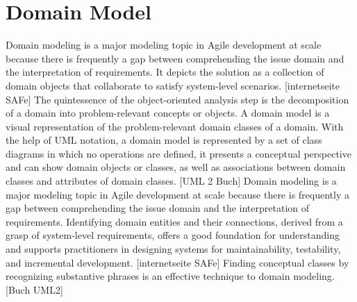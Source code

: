 \section{Domain Model}
Domain modeling is a major modeling topic in Agile development at scale because there is frequently a gap between comprehending the issue domain and the interpretation of requirements. It depicts the solution as a collection of domain objects that collaborate to satisfy system-level scenarios. [internetseite SAFe] The quintessence of the object-oriented analysis step is the decomposition of a domain into problem-relevant concepts or objects. A domain model is a visual representation of the problem-relevant domain classes of a domain. With the help of UML notation, a domain model is represented by a set of class diagrams in which no operations are defined, it presents a conceptual perspective and can show domain objects or classes, as well as associations between domain classes and attributes of domain classes. [UML 2 Buch]  Domain modeling is a major modeling topic in Agile development at scale because there is frequently a gap between comprehending the issue domain and the interpretation of requirements. Identifying domain entities and their connections, derived from a grasp of system-level requirements, offers a good foundation for understanding and supports practitioners in designing systems for maintainability, testability, and incremental development. [internetseite SAFe] Finding conceptual classes by recognizing substantive phrases is an effective technique to domain modeling. [Buch UML2]

